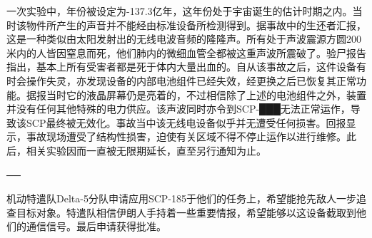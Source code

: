 

一次实验中，年份被设定为-137.3亿年，这年份处于宇宙诞生的估计时期之内。当时该物件所产生的声音并不能经由标准设备所检测得到。据事故中的生还者汇报，这是一种类似由太阳发射出的无线电波音频的隆隆声。所有处于声波震源方圆200米内的人皆因窒息而死，他们肺内的微细血管全都被这重声波所震破了。验尸报告指出，基本上所有受害者都是死于体内大量出血的。自从该事故之后，这件设备有时会操作失灵，亦发现设备的内部电池组件已经失效，经更换之后已恢复其正常功能。据报当时它的液晶屏幕仍是亮着的，不过相信除了上述的电池组件之外，装置并没有任何其他特殊的电力供应。该声波同时亦令到SCP-███无法正常运作，导致该SCP最终被无效化。事故当中该无线电设备似乎并无遭受任何损害。回报显示，事故现场遭受了结构性损害，迫使有关区域不得不停止运作以进行维修。此后，相关实验因而一直被无限期延长，直至另行通知为止。

──


机动特遣队Delta-5分队申请应用SCP-185于他们的任务上，希望能抢先敌人一步追查目标对象。特遣队相信伊朗人手持着一些重要情报，希望能够以这设备截取到他们的通信信号。最后申请获得批准。
